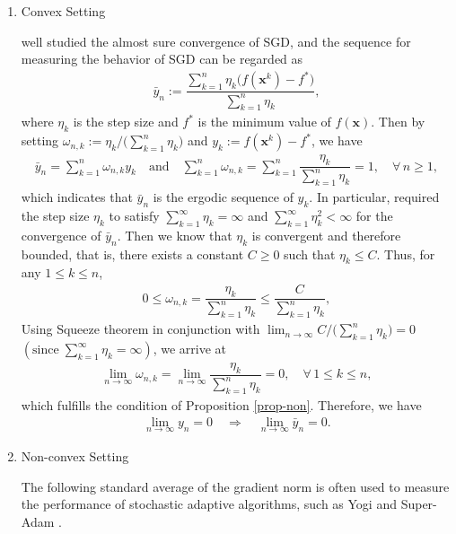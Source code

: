 \documentclass[twoside,11pt]{article}
\begin{document}
\begin{example}
\begin{enumerate}
\item[$(2)$]Convex Setting
\par \citet{sebbouh2021almost} well studied the almost sure convergence of SGD, and the sequence for measuring the behavior of SGD can be regarded as
\begin{align*}
	\bar{y}_{n}
	:=
	\dfrac{\sum_{k=1}^{n}\eta_{k}
	\big(f(\mathbf{x}^{k})-f^{*}\big)}
	{\sum_{k=1}^{n}\eta_{k}},
\end{align*}	
where $\eta_{k}$ is the step size and $f^{*}$ is the minimum value of $f(\mathbf{x})$. Then by setting $\omega_{n,k}:=\eta_{k}/\big(\sum_{k=1}^{n}\eta_{k}\big)$ and $y_{k}:=f(\mathbf{x}^{k})-f^{*}$, we have 
\begin{align*}
	\bar{y}_{n}
	=\sum_{k=1}^{n}
	\omega_{n,k}y_{k}
	\quad \text{and}\quad 
	\sum_{k=1}^{n}\omega_{n,k}=
	\sum_{k=1}^{n}
	\dfrac{\eta_{k}}
	{\sum_{k=1}^{n}\eta_{k}}=1,\quad 
	\forall\,n\geq 1,	
\end{align*}
which indicates that $\bar{y}_{n}$ is the ergodic sequence of $y_{k}$. In particular, \citet{sebbouh2021almost} required the step size $\eta_{k}$ to satisfy $\sum_{k=1}^{\infty}\eta_{k}=\infty$ and $\sum_{k=1}^{\infty}\eta_{k}^{2}<\infty$ for the convergence of $\bar{y}_{n}$. Then we know that $\eta_{k}$ is convergent and therefore bounded, that is, there exists a constant $C\geq 0$ such that $\eta_{k}\leq C$. Thus, for any $1\leq k\leq n$, 
\begin{align*}
	0\leq \omega_{n,k}
	=\dfrac{\eta_{k}}
	{\sum_{k=1}^{n}\eta_{k}}
	\leq \dfrac{C}
	{\sum_{k=1}^{n}\eta_{k}},
\end{align*}
Using Squeeze theorem in conjunction with $\lim_{n\to\infty}C/\big(\sum_{k=1}^{n}\eta_{k}\big)=0$ $(\text{since}\; \sum_{k=1}^{\infty}\eta_{k}=\infty)$, we arrive at
\begin{align*}
	\lim_{n\to\infty}
	\omega_{n,k}
	=\lim_{n\to\infty}
	\dfrac{\eta_{k}}
	{\sum_{k=1}^{n}\eta_{k}}
	=0,\quad \forall\,1\leq k\leq n,
\end{align*}
which fulfills the condition of Proposition \ref{prop-non}. Therefore, we have
\begin{align*}
	\lim_{n\to\infty}
	y_{n}=0
	\quad \Longrightarrow\quad 
	\lim_{n\to\infty}
	\bar{y}_{n}=0.
\end{align*}
\item[$(3)$] Non-convex Setting
\par The following standard average of the gradient norm is often used to measure the performance of stochastic adaptive algorithms, such as Yogi \citep{zaheer2018adaptive} and Super-Adam \citep{huang2021super}.

\end{enumerate}
\end{example}
\end{document}
